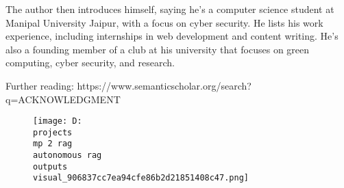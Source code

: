\documentclass[12pt,a4paper]{article}
\begin{document}
The author then introduces himself, saying he's a computer science student at Manipal University Jaipur, with a focus on cyber security. He lists his work experience, including internships in web development and content writing. He's also a founding member of a club at his university that focuses on green computing, cyber security, and research.

Further reading: https://www.semanticscholar.org/search?q=ACKNOWLEDGMENT
\begin{figure}[h]
\centering
\texttt{[image: D:\\projects\\mp 2 rag\\autonomous rag\\outputs\\visual\_906837cc7ea94cfe86b2d21851408c47.png]}
\end{figure}
\end{document}
